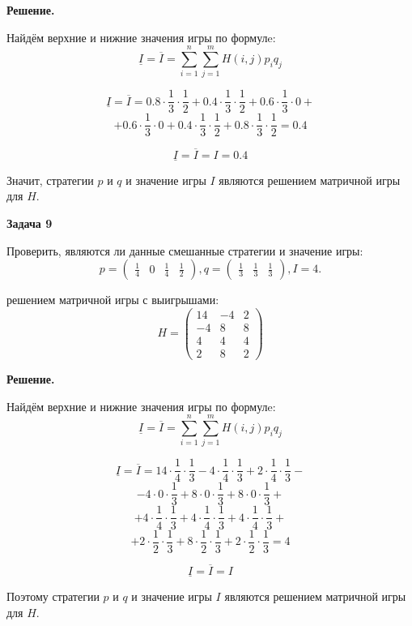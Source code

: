 \documentclass[a4paper,14pt]{extreport}
\begin{document}
\textbf{Решение.} 

Найдём верхние и нижние значения игры по формулe:
$$
    \underline{I} = \overline{I} = \sum_{i=1}^n\sum_{j=1}^mH(i,j) p_i q_j
$$

$$
    \underline{I} = \overline{I} = 0.8 \cdot \frac{1}{3} \cdot \frac{1}{2} + 0.4 \cdot \frac{1}{3} \cdot \frac{1}{2} + 0.6 \cdot \frac{1}{3} \cdot 0 +
$$ $$ +
	0.6 \cdot \frac{1}{3} \cdot 0 + 0.4 \cdot \frac{1}{3} \cdot \frac{1}{2} + 0.8 \cdot \frac{1}{3} \cdot \frac{1}{2} = 0.4
$$

$$
    \underline{I} = \overline{I} = I = 0.4
$$

Значит, стратегии $p$ и $q$ и значение игры $I$ являются решением матричной игры для $H$.
\newline

\textbf{Задача 9}

Проверить, являются ли данные смешанные стратегии и значение игры:
\begin{equation*}
    p = \begin{pmatrix}\frac{1}{4} & 0 & \frac{1}{4} & \frac{1}{2} \end{pmatrix}, 
    q = \begin{pmatrix}\frac{1}{3} & \frac{1}{3} & \frac{1}{3} \end{pmatrix},
    I = 4.
\end{equation*} \par
решением матричной игры с выигрышами:
\begin{equation*}
    H = \begin{pmatrix} 
            14 & -4 & 2 \\
            -4 & 8 & 8 \\
            4 & 4 & 4 \\
            2& 8 & 2
        \end{pmatrix}
\end{equation*}

\textbf{Решение.} 

Найдём верхние и нижние значения игры по формулe:
$$
    \underline{I} = \overline{I} = \sum_{i=1}^n\sum_{j=1}^mH(i,j) p_i q_j
$$

$$
    \underline{I} = \overline{I} = 14 \cdot \frac{1}{4} \cdot \frac{1}{3} - 4 \cdot \frac{1}{4} \cdot \frac{1}{3} + 2 \cdot \frac{1}{4} \cdot \frac{1}{3} -
$$ $$
    - 4 \cdot 0 \cdot \frac{1}{3} + 8 \cdot 0 \cdot \frac{1}{3} + 8 \cdot 0 \cdot \frac{1}{3} + 
$$ $$
    + 4 \cdot \frac{1}{4} \cdot \frac{1}{3} + 4 \cdot \frac{1}{4} \cdot \frac{1}{3} + 4 \cdot \frac{1}{4} \cdot \frac{1}{3} +
$$ $$
	+ 2 \cdot \frac{1}{2} \cdot \frac{1}{3} + 8 \cdot \frac{1}{2} \cdot \frac{1}{3} + 2 \cdot \frac{1}{2} \cdot \frac{1}{3} = 4
$$

$$
    \underline{I} = \overline{I} = I
$$

Поэтому стратегии $p$ и $q$ и значение игры $I$ являются решением матричной игры для $H$.
\newline
\end{document}
